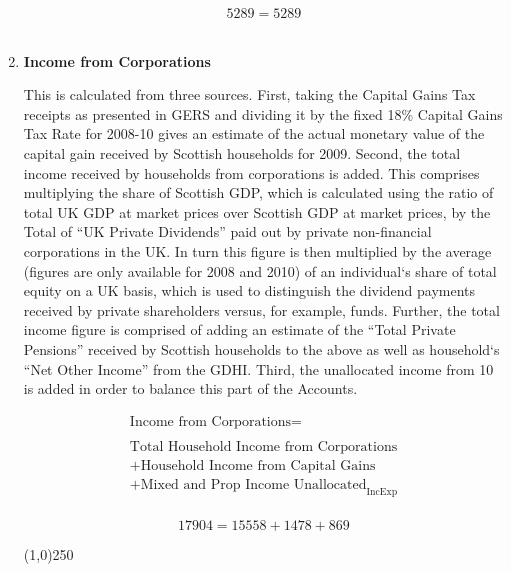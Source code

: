 \begin{enumerate}
\begin{equation} \nonumber
5289 = 5289
\end{equation}\\


\item \textbf {Income from Corporations}

This is calculated from three sources. First, taking the Capital Gains Tax receipts as presented in GERS and dividing it by the fixed 18\% Capital Gains Tax Rate for 2008-10 gives an estimate of the actual monetary value of the capital gain received by Scottish households for 2009. 
Second, the total income received by households from corporations is added. This comprises multiplying the share of Scottish GDP, which is calculated using the ratio of total UK GDP at market prices over Scottish GDP at market prices, by the Total of ``UK Private Dividends'' paid out by private non-financial corporations in the UK. In turn this figure is then multiplied by the average (figures are only available for 2008 and 2010) of an individual`s share of total equity on a UK basis, which is used to distinguish the dividend payments received by private shareholders versus, for example, funds. Further, the total income figure is comprised of adding an estimate of the ``Total Private Pensions'' received by Scottish households to the above as well as household`s ``Net Other Income'' from the GDHI. 
Third, the unallocated income from 10 is added in order to balance this part of the Accounts.  \cite{ScotGov2013b,HMRC2013,ONS2011c,ONS2012}


\begin{equation}
\begin{split}
\text{Income from Corporations} =  \\ \\
\text{Total Household Income from Corporations}\\
+\text{Household Income from Capital Gains}\\
+\text{Mixed and Prop Income Unallocated}_\text{IncExp}\\
\end{split} \label{eq:2.5.4}
\end{equation}

\begin{equation} \nonumber
17904 = 15558+1478+869
\end{equation}

\begin{center}
\line(1,0){250}
\end{center}


\end{enumerate}
